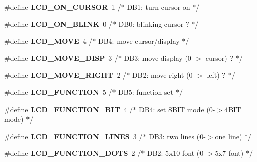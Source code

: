 \begin{DoxyCompactItemize}
\item 
\#define {\bfseries L\+C\+D\+\_\+\+O\+N\+\_\+\+C\+U\+R\+S\+OR}~1 /$\ast$   D\+B1\+: turn cursor on               $\ast$/\hypertarget{a00006_ga47638b5ebbaec9600a0ebf9a55caf802}{}\label{a00006_ga47638b5ebbaec9600a0ebf9a55caf802}

\item 
\#define {\bfseries L\+C\+D\+\_\+\+O\+N\+\_\+\+B\+L\+I\+NK}~0 /$\ast$     D\+B0\+: blinking cursor ?          $\ast$/\hypertarget{a00006_ga5d76592a978537acee615098ce4d80f5}{}\label{a00006_ga5d76592a978537acee615098ce4d80f5}

\item 
\#define {\bfseries L\+C\+D\+\_\+\+M\+O\+VE}~4 /$\ast$ D\+B4\+: move cursor/display            $\ast$/\hypertarget{a00006_ga3f4f758b80fcfa6c9e4db58e2515c78a}{}\label{a00006_ga3f4f758b80fcfa6c9e4db58e2515c78a}

\item 
\#define {\bfseries L\+C\+D\+\_\+\+M\+O\+V\+E\+\_\+\+D\+I\+SP}~3 /$\ast$   D\+B3\+: move display (0-\/$>$ cursor) ?  $\ast$/\hypertarget{a00006_gaaddc2afa9a02bfa748950f2c1e6a204d}{}\label{a00006_gaaddc2afa9a02bfa748950f2c1e6a204d}

\item 
\#define {\bfseries L\+C\+D\+\_\+\+M\+O\+V\+E\+\_\+\+R\+I\+G\+HT}~2 /$\ast$   D\+B2\+: move right (0-\/$>$ left) ?      $\ast$/\hypertarget{a00006_ga97cdb19acf109ad52ab4994d2ad02cee}{}\label{a00006_ga97cdb19acf109ad52ab4994d2ad02cee}

\item 
\#define {\bfseries L\+C\+D\+\_\+\+F\+U\+N\+C\+T\+I\+ON}~5 /$\ast$ D\+B5\+: function set                   $\ast$/\hypertarget{a00006_ga50de1697f1da8ab075a6b4d7aeace64e}{}\label{a00006_ga50de1697f1da8ab075a6b4d7aeace64e}

\item 
\#define {\bfseries L\+C\+D\+\_\+\+F\+U\+N\+C\+T\+I\+O\+N\+\_\+B\+IT}~4 /$\ast$   D\+B4\+: set 8\+B\+I\+T mode (0-\/$>$4\+B\+I\+T mode) $\ast$/\hypertarget{a00006_ga91d15d8e3008f6cb141406a8b5d0d3c0}{}\label{a00006_ga91d15d8e3008f6cb141406a8b5d0d3c0}

\item 
\#define {\bfseries L\+C\+D\+\_\+\+F\+U\+N\+C\+T\+I\+O\+N\+\_\+L\+I\+N\+ES}~3 /$\ast$   D\+B3\+: two lines (0-\/$>$one line)      $\ast$/\hypertarget{a00006_ga6c24806bed18d565917165caa3475463}{}\label{a00006_ga6c24806bed18d565917165caa3475463}

\item 
\#define {\bfseries L\+C\+D\+\_\+\+F\+U\+N\+C\+T\+I\+O\+N\+\_\+D\+O\+TS}~2 /$\ast$   D\+B2\+: 5x10 font (0-\/$>$5x7 font)      $\ast$/\hypertarget{a00006_ga48de81358277fe4f2810c2b82f90397e}{}\label{a00006_ga48de81358277fe4f2810c2b82f90397e}


\end{DoxyCompactItemize}
